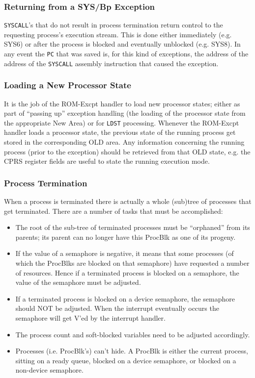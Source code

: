 \subsubsection{Returning from a SYS/Bp Exception}
\verb+SYSCALL+'s that do not result in process termination return control to the requesting process's execution stream. 
This is done either immediately (e.g. SYS6) or
after the process is blocked and eventually unblocked (e.g. SYS8). In any event
the \verb+PC+ that was saved is, for this kind of exceptions, the address of the address of the \verb+SYSCALL+ assembly instruction
that caused the exception.
\subsubsection{Loading a New Processor State}
It is the job of the ROM-Excpt handler to load new processor states; either as
part of “passing up” exception handling (the loading of the processor state from
the appropriate New Area) or for \verb+LDST+ processing. 
Whenever the ROM-Excpt handler loads a processor state, the previous state
of the running process get stored in the corresponding OLD area.
Any information concerning the running process (prior to the exception) should be retrieved from
that OLD state, e.g. the CPRS register fields are useful to state the
running execution mode.
\subsubsection{Process Termination}
When a process is terminated there is actually a whole (sub)tree of processes that
get terminated. There are a number of tasks that must be accomplished:
\begin{itemize}
	\item The root of the sub-tree of terminated processes must be “orphaned” from
	its parents; its parent can no longer have this ProcBlk as one of its progeny.
	\item If the value of a semaphore is negative, it means that some processes (of which the ProcBlks are blocked on that semaphore) have requested a number of resources. Hence if a terminated process is blocked on a semaphore, the
	value of the semaphore must be adjusted.
	\item If a terminated process is blocked on a device semaphore, the semaphore
	should NOT be adjusted. When the interrupt eventually occurs the semaphore
	will get V'ed by the interrupt handler.
	\item The process count and soft-blocked variables need to be adjusted accordingly.
	\item Processes (i.e. ProcBlk's) can't hide. A ProcBlk is either the current process, sitting on a ready queue, blocked on a device semaphore, or blocked on a non-device semaphore.
\end{itemize}
